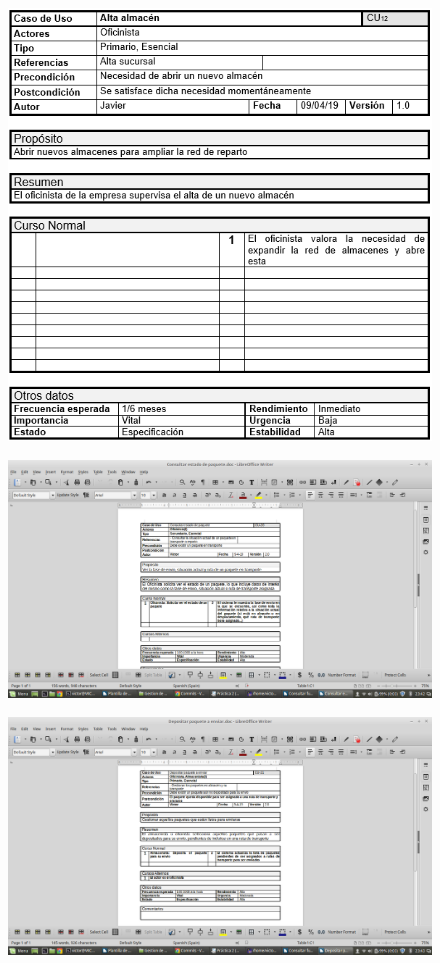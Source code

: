 \begin{figure}[H]
	\centering
	\includegraphics[width=16cm]{12}
\end{figure}
\begin{figure}[H]
	\centering
	\includegraphics[width=20cm]{20}
\end{figure}
\begin{figure}[H]
	\centering
	\includegraphics[width=20cm]{21}
\end{figure}

